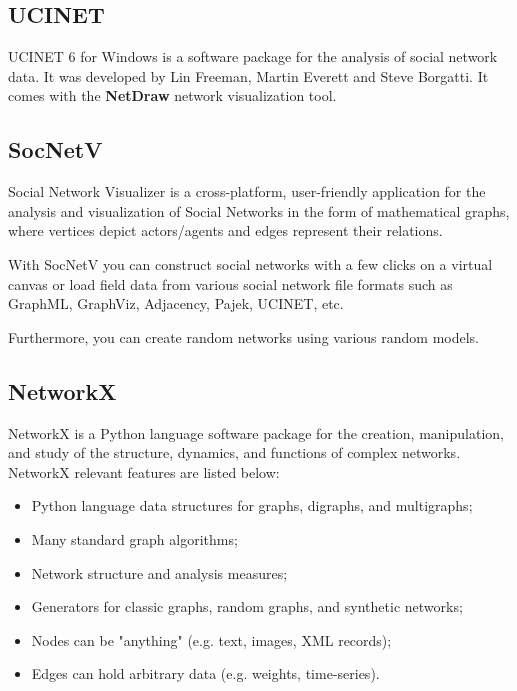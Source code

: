 \subsection{UCINET}

\indent \indent UCINET 6 \cite{ucinet-software} for Windows is a software package for the analysis of social network data. It was developed by Lin Freeman, Martin Everett and Steve Borgatti. It comes with the \textbf{NetDraw} \cite{borgatti2002netdraw} network visualization tool.

\subsection{SocNetV}

\indent \indent Social Network Visualizer \cite{socnetv} is a cross-platform, user-friendly application for the analysis and visualization of Social Networks in the form of mathematical graphs, where vertices depict actors/agents and edges represent their relations.

With SocNetV you can construct social networks with a few clicks on a virtual canvas or load field data from various social network file formats such as GraphML, GraphViz, Adjacency, Pajek, UCINET, etc.

Furthermore, you can create random networks using various random models.

\subsection{NetworkX}
\indent \indent NetworkX \cite{hagberg2013networkx} is a Python language software package for the creation, manipulation, and study of the structure, dynamics, and functions of complex networks. NetworkX relevant features are listed below:
\begin{itemize}
    \item Python language data structures for graphs, digraphs, and multigraphs;
    \item Many standard graph algorithms;
    \item Network structure and analysis measures;
    \item Generators for classic graphs, random graphs, and synthetic networks;
    \item Nodes can be "anything" (e.g. text, images, XML records);
    \item Edges can hold arbitrary data (e.g. weights, time-series).
\end{itemize}


